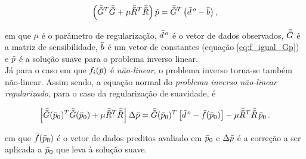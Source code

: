 \begin{equation}
\left(\bar{\bar{G}}^T\bar{\bar{G}} + \mu\bar{\bar{R}}^T\bar{\bar{R}}\right)\tilde{p} =
    \bar{\bar{G}}^T\left(\bar{d}^{\thinspace o} - \bar{b} \right) ,
\end{equation}

\noindent em que $\mu$ é o parâmetro de regularização, $\bar{d}^{\thinspace o}$
é o vetor de dados observados, $\bar{\bar{G}}$ é a matriz de sensibilidade, $\bar{b}$
é um vetor de constantes (equação \ref{eq:f_igual_Gp}) e $\tilde{p}$ é a solução
suave para o problema inverso linear.
\\
\indent Já para o caso em que $f_i(\bar{p})$ é {\it não-linear}, o problema
inverso torna-se também não-linear. Assim sendo, a equação normal do
{\it problema inverso não-linear regularizado}, para o caso da regularização de
suavidade, é

\begin{equation}
\left[\bar{\bar{G}}(\bar{p}_0)^T\bar{\bar{G}}(\bar{p}_0) +
      \mu\bar{\bar{R}}^T\bar{\bar{R}}\right]\Delta\bar{p} =
\bar{\bar{G}}(\bar{p}_0)^T \left[\bar{d}^{\thinspace o} - \bar{f}(\bar{p}_0)\right] -
\mu\bar{\bar{R}}^T\bar{\bar{R}}\thinspace\bar{p}_0
    \thinspace .
\end{equation}

\noindent em que $\bar{f}(\bar{p}_0)$ é o vetor de dados preditos avaliado em
$\bar{p}_0$ e $\Delta\bar{p}$ é a correção a ser aplicada a $\bar{p}_0$
que leva à solução suave.
